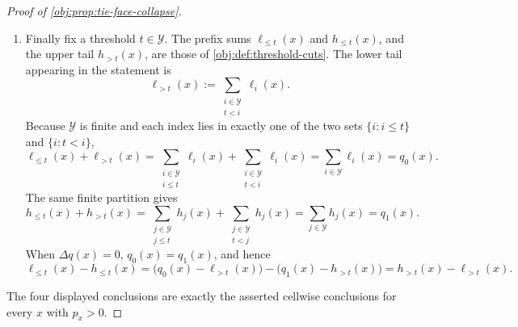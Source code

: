 \documentclass[11pt]{article}
\begin{document}
\begin{proof}[Proof of \cref{obj:prop:tie-face-collapse}]
\begin{enumerate}
\item Finally fix a threshold \(t\in\mathcal Y\). The prefix sums \(\ell_{\le t}(x)\) and \(h_{\le t}(x)\), and the upper tail \(h_{>t}(x)\), are those of \cref{obj:def:threshold-cuts}. The lower tail appearing in the statement is
\[
\ell_{>t}(x):=\sum_{\substack{i\in\mathcal Y\\ t<i}}\ell_i(x).
\]
Because \(\mathcal Y\) is finite and each index lies in exactly one of the two sets \(\{i:i\le t\}\) and \(\{i:t<i\}\),
\[
\ell_{\le t}(x)+\ell_{>t}(x)
=
\sum_{\substack{i\in\mathcal Y\\ i\le t}}\ell_i(x)
+
\sum_{\substack{i\in\mathcal Y\\ t<i}}\ell_i(x)
=
\sum_{i\in\mathcal Y}\ell_i(x)
=
q_0(x).
\]
The same finite partition gives
\[
h_{\le t}(x)+h_{>t}(x)
=
\sum_{\substack{j\in\mathcal Y\\ j\le t}}h_j(x)
+
\sum_{\substack{j\in\mathcal Y\\ t<j}}h_j(x)
=
\sum_{j\in\mathcal Y}h_j(x)
=
q_1(x).
\]
When \(\Delta q(x)=0\), \(q_0(x)=q_1(x)\), and hence
\[
\ell_{\le t}(x)-h_{\le t}(x)
=
\bigl(q_0(x)-\ell_{>t}(x)\bigr)
-
\bigl(q_1(x)-h_{>t}(x)\bigr)
=
h_{>t}(x)-\ell_{>t}(x).
\]
\end{enumerate}
The four displayed conclusions are exactly the asserted cellwise conclusions for every \(x\) with \(p_x>0\). %
\end{proof}
\end{document}
